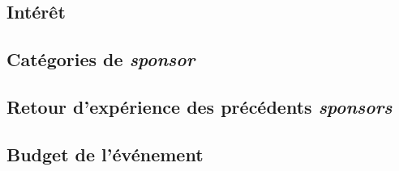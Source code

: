 
	\subsection{Intérêt}
	\subsection{Catégories de \textit{sponsor}}
	\subsection{Retour d’expérience des précédents \textit{sponsors}}
	\subsection{Budget de l’événement}